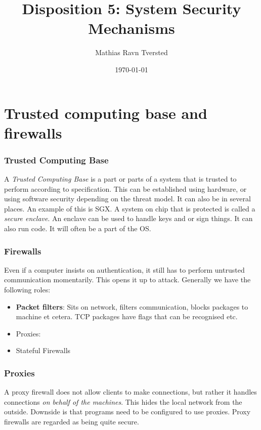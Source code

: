 \documentclass[14pt]{beamer}
\title{Disposition 5: System Security Mechanisms}
\author{Mathias Ravn Tversted}
\date{\today}
\begin{document}
\frame{\titlepage} 




\section{Trusted computing base and firewalls}

\begin{frame}
    \frametitle{Trusted Computing Base}
        A \textit{Trusted Computing Base} is a part or parts of a system that is trusted to perform according to specification. This can be established using hardware, or using software security depending on the threat model. It can also be in several places. An example of this is SGX. A system on chip that is protected is called a \textit{secure enclave}. An enclave can be used to handle keys and or sign things. It can also run code. It will often be a part of the OS. 
\end{frame}


\begin{frame}
    \frametitle{Firewalls}
        Even if a computer insists on authentication, it still has to perform untrusted communication momentarily. This opens it up to attack. Generally we have the following roles:
        \begin{itemize}
            \item \textbf{Packet filters}: Sits on network, filters communication, blocks packages to machine et cetera. TCP packages have flags that can be recognised etc.
            \item Proxies: 
            \item Stateful Firewalls
        \end{itemize}
\end{frame}


\begin{frame}
    \frametitle{Proxies}
        A proxy firewall does not allow clients to make connections, but rather it handles connections \textit{on behalf of the machines}. This hides the local network from the outside. Downside is that programs need to be configured to use proxies. Proxy firewalls are regarded as being quite secure. 
\end{frame}
\end{document}

